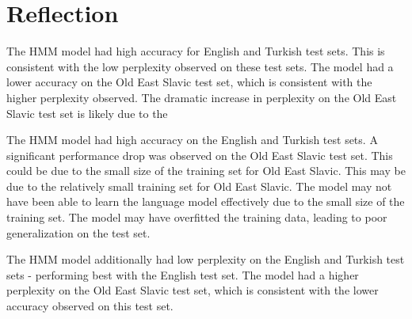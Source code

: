 \documentclass[a4paper, 12pt]{article}
\begin{document}
\pagebreak
\section{Reflection}

The HMM model had high accuracy for English and Turkish test sets. This is consistent with the low perplexity observed on these test sets. The model had a lower accuracy on the Old East Slavic test set, which is consistent with the higher perplexity observed. The dramatic increase in perplexity on the Old East Slavic test set is likely due to the 

The HMM model had high accuracy on the English and Turkish test sets. A significant performance drop was observed on the Old East Slavic test set. This could be due to the small size of the training set for Old East Slavic. This may be due to the relatively small training set for Old East Slavic. The model may not have been able to learn the language model effectively due to the small size of the training set. The model may have overfitted the training data, leading to poor generalization on the test set.

The HMM model additionally had low perplexity on the English and Turkish test sets - performing best with the English test set. The model had a higher perplexity on the Old East Slavic test set, which is consistent with the lower accuracy observed on this test set.

\end{document}
